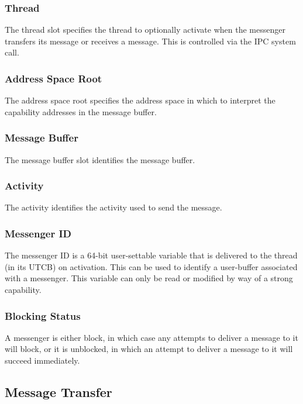 \subsubsection{Thread}

The thread slot specifies the thread to optionally activate when the
messenger transfers its message or receives a message.  This is
controlled via the IPC system call.

\subsubsection{Address Space Root}

The address space root specifies the address space in which to
interpret the capability addresses in the message buffer.

\subsubsection{Message Buffer}

The message buffer slot identifies the message buffer.

\subsubsection{Activity}

The activity identifies the activity used to send the message.

\subsubsection{Messenger ID}

The messenger ID is a 64-bit user-settable variable that is delivered
to the thread (in its UTCB) on activation.  This can be used to
identify a user-buffer associated with a messenger.  This variable can
only be read or modified by way of a strong capability.

\subsubsection{Blocking Status}

A messenger is either block, in which case any attempts to deliver a
message to it will block, or it is unblocked, in which an attempt to
deliver a message to it will succeed immediately.

\subsection{Message Transfer}

